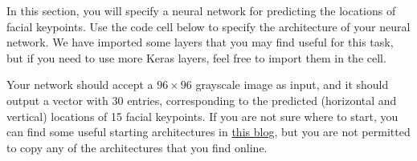 \documentclass[11pt]{article}
\begin{document}
In this section, you will specify a neural network for predicting the
locations of facial keypoints. Use the code cell below to specify the
architecture of your neural network. We have imported some layers that
you may find useful for this task, but if you need to use more Keras
layers, feel free to import them in the cell.

Your network should accept a \(96 \times 96\) grayscale image as input,
and it should output a vector with 30 entries, corresponding to the
predicted (horizontal and vertical) locations of 15 facial keypoints. If
you are not sure where to start, you can find some useful starting
architectures in
\href{http://danielnouri.org/notes/2014/12/17/using-convolutional-neural-nets-to-detect-facial-keypoints-tutorial/}{this
blog}, but you are not permitted to copy any of the architectures that
you find online.
\end{document}
